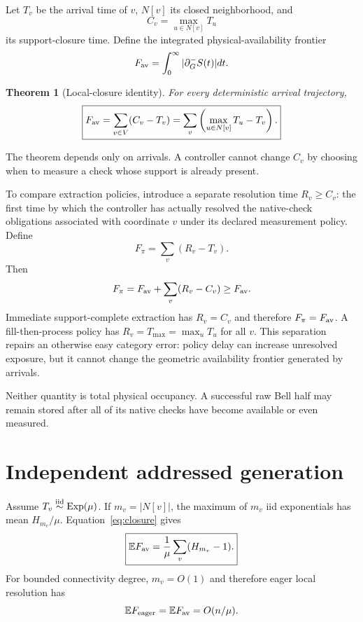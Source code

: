 \documentclass[aps,prx,reprint,superscriptaddress,nofootinbib,longbibliography,floatfix]{revtex4-2}
\newtheorem{theorem}{Theorem}\newtheorem{proposition}[theorem]{Proposition}\newtheorem{corollary}[theorem]{Corollary}
\newcommand{\E}{\mathbb E}\newcommand{\Prob}{\mathbb P}
\begin{document}
Let $T_v$ be the arrival time of $v$, $N[v]$ its closed neighborhood, and
\begin{equation}
C_v=\max_{u\in N[v]}T_u
\end{equation}
its support-closure time. Define the integrated physical-availability frontier
\begin{equation}
F_{\rm av}=\int_0^\infty |\partial_G^-S(t)|dt.
\end{equation}

\begin{theorem}[Local-closure identity]
For every deterministic arrival trajectory,
\begin{equation}
\boxed{F_{\rm av}=\sum_{v\in V}(C_v-T_v)
=\sum_v\left(\max_{u\in N[v]}T_u-T_v\right).}
\label{eq:closure}
\end{equation}
\end{theorem}
The theorem depends only on arrivals. A controller cannot change $C_v$ by choosing when to measure a check whose support is already present.

To compare extraction policies, introduce a separate resolution time $R_v\ge C_v$: the first time by which the controller has actually resolved the native-check obligations associated with coordinate $v$ under its declared measurement policy. Define
\begin{equation}
F_\pi=\sum_v(R_v-T_v).
\label{eq:policyexp}
\end{equation}
Then
\begin{equation}
F_\pi=F_{\rm av}+\sum_v(R_v-C_v)\ge F_{\rm av}.
\end{equation}
Immediate support-complete extraction has $R_v=C_v$ and therefore $F_\pi=F_{\rm av}$. A fill-then-process policy has $R_v=T_{\max}=\max_uT_u$ for all $v$. This separation repairs an otherwise easy category error: policy delay can increase unresolved exposure, but it cannot change the geometric availability frontier generated by arrivals.

Neither quantity is total physical occupancy. A successful raw Bell half may remain stored after all of its native checks have become available or even measured.

\section{Independent addressed generation}
Assume $T_v\stackrel{\rm iid}{\sim}\mathrm{Exp}(\mu)$. If $m_v=|N[v]|$, the maximum of $m_v$ iid exponentials has mean $H_{m_v}/\mu$. Equation~\eqref{eq:closure} gives
\begin{equation}
\boxed{\E F_{\rm av}=\frac1\mu\sum_v(H_{m_v}-1).}
\label{eq:harmonic}
\end{equation}
For bounded connectivity degree, $m_v=O(1)$ and therefore eager local resolution has
\begin{equation}
\E F_{\rm eager}=\E F_{\rm av}=O(n/\mu).
\end{equation}
\end{document}
